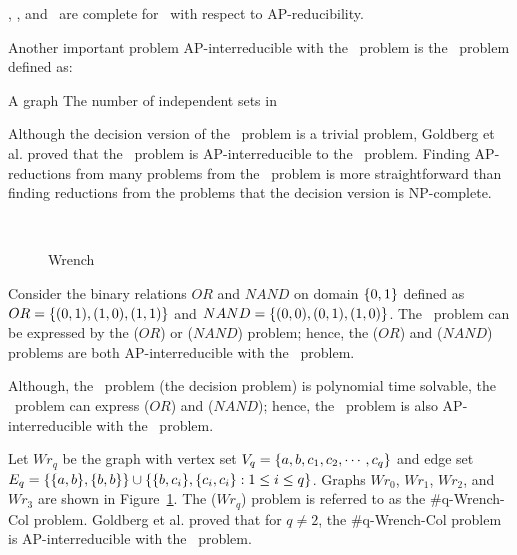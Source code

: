 \begin{cor}
\csat, \ctsat, and \ctcol\ are complete for \cp\ with respect to AP-reducibility.
\end{cor}

Another important problem AP-interreducible with the \csat\ problem is the \cis\ problem defined as:

\pnndef%
{A graph \mG}
{The number of independent sets in \mG}

Although the decision version of the \cis\ problem is a trivial problem, Goldberg et al.
\cite{Leslie03} proved that the \cis\ problem is AP-interreducible to the \csat\ problem. 
Finding AP-reductions from many problems from the \cis\ problem is more straightforward than
finding reductions from the problems that the decision version is NP-complete.

\begin{figure}[h]
\centering 
\subfigure[\ensuremath{Wr_0}]{\label{fig:Wr0}}\hspace{4.78cm}
\subfigure[\ensuremath{Wr_1}]{\label{fig:Wr1}}\\
\subfigure[\ensuremath{Wr_2}]{\label{fig:Wr2}}\hspace{4cm}
\subfigure[\ensuremath{Wr_3}]{\label{fig:Wr3}}
\caption{Wrench}
\label{fig:wrench}
\end{figure}

\begin{example}
Consider the binary relations \(OR\) and \(NAND\) on domain \(\{{{0,1}}\}\) defined as
\(OR=\{{(0,1),(1,0),(1,1)}\}\) and \(NAND=\{{(0,0),(0,1),(1,0)}\}\)\@.
The \cis\ problem can be expressed by the \ccsp(\(OR\)) or \ccsp(\(NAND\)) problem;
hence, the \ccsp(\(OR\)) and \ccsp(\(NAND\)) problems are both AP-interreducible with the
\csat\ problem.

Although, the \dsat\ problem (the decision problem) is polynomial time
solvable, the \cdsat\ problem can express \ccsp(\(OR\)) and
\ccsp(\(NAND\)); hence, the \cdsat\ problem 
is also AP-interreducible with the \csat\ problem.
\end{example}

\begin{example} \label{exm:wrench}
Let \(Wr_q\) be the graph with vertex set \(V_q=\{{a,b,c_1,c_2,\cdots,c_q}\}\)
and edge set \(E_q=\{{\{{a,b}\},\{{b,b}\}}\} \cup 
\{{\{{b,c_i}\},\{{c_i,c_i}\}:1\le i\le q}\}\)\@.
Graphs \(Wr_0\), \(Wr_1\), \(Wr_2\), and \(Wr_3\) are shown in Figure~\ref{fig:wrench}.
The \chom(\(Wr_q\)) problem is referred to as the \#q-{\sc Wrench-Col} problem. 
Goldberg et al. \cite{Leslie03} proved that for \(q\neq 2\), the  \#q-{\sc Wrench-Col} problem
is AP-interreducible with the \csat\ problem.
\end{example}


